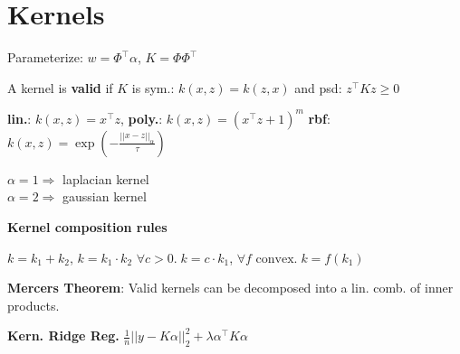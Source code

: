 \section*{Kernels}

Parameterize: $w = \Phi^\top \alpha$, $K = \Phi \Phi^\top$

A kernel is \textbf{valid} if $K$ is sym.: $k(x,z) = k(z,x)$ and psd: $z^\top K z \geq 0$

\textbf{lin.}: $k(x, z) = x^\top z$, \textbf{poly.}: $k(x, z) = (x^\top z + 1)^m$
\textbf{rbf}: $k(x, z) = \exp ( -\frac{||x - z||_\alpha}{\tau} )$

$\alpha = 1 \Rightarrow $ laplacian kernel \\
$\alpha = 2 \Rightarrow $ gaussian kernel

\textbf{Kernel composition rules}

$k = k_1 + k_2$, \quad $k = k_1 \cdot k_2$ \quad $\forall c > 0. \; k = c \cdot k_1$,
$\forall f \text{ convex}. \; k = f(k_1) $

\textbf{Mercers Theorem}: Valid kernels can be decomposed into a lin. comb. of inner products.

\textbf{Kern. Ridge Reg.}
$\frac{1}{n} ||y - K\alpha ||_2^2 + \lambda \alpha^\top K \alpha$
